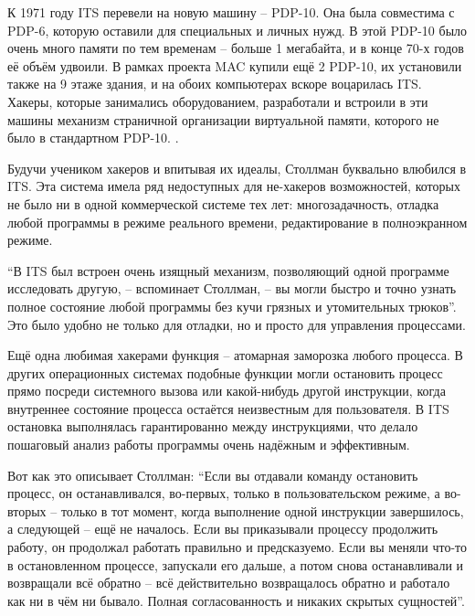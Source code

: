 К 1971 году ITS перевели на новую машину -- PDP-10. Она была совместима с PDP-6, которую оставили для специальных и личных нужд. В этой PDP-10 было очень много памяти по тем временам -- больше 1 мегабайта, и в конце 70-х годов её объём удвоили. В рамках проекта MAC купили ещё 2 PDP-10, их установили также на 9 этаже здания, и на обоих компьютерах вскоре воцарилась ITS. Хакеры, которые занимались оборудованием, разработали и встроили в эти машины механизм страничной организации виртуальной памяти, которого не было в стандартном PDP-10. .

Будучи учеником хакеров и впитывая их идеалы, Столлман буквально влюбился в ITS. Эта система имела ряд недоступных для не-хакеров возможностей, которых не было ни в одной коммерческой системе тех лет: многозадачность, отладка любой программы в режиме реального времени, редактирование в полноэкранном режиме.

\enquote{В ITS был встроен очень изящный механизм, позволяющий одной программе исследовать другую, -- вспоминает Столлман, -- вы могли быстро и точно узнать полное состояние любой программы без кучи грязных и утомительных трюков}. Это было удобно не только для отладки, но и просто для управления процессами.

Ещё одна любимая хакерами функция -- атомарная заморозка любого процесса. В других операционных системах подобные функции могли остановить процесс прямо посреди системного вызова или какой-нибудь другой инструкции, когда внутреннее состояние процесса остаётся неизвестным для пользователя. В ITS остановка выполнялась гарантированно между инструкциями, что делало пошаговый анализ работы программы очень надёжным и эффективным.

Вот как это описывает Столлман: \enquote{Если вы отдавали команду остановить процесс, он останавливался, во-первых, только в пользовательском режиме, а во-вторых -- только в тот момент, когда выполнение одной инструкции завершилось, а следующей -- ещё не началось. Если вы приказывали процессу продолжить работу, он продолжал работать правильно и предсказуемо. Если вы меняли что-то в остановленном процессе, запускали его дальше, а потом снова останавливали и возвращали всё обратно -- всё действительно возвращалось обратно и работало как ни в чём ни бывало. Полная согласованность и никаких скрытых сущностей}.

